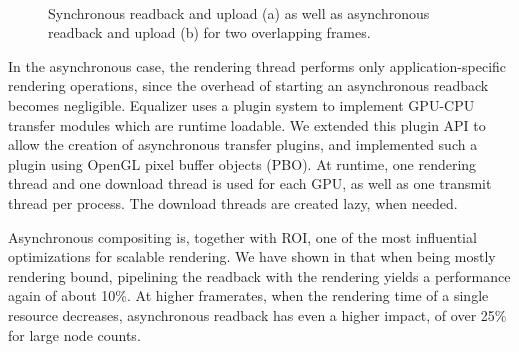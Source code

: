 \begin{figure}[ht]\center
  \\
  \caption{Synchronous readback and upload (a) as well as
    asynchronous readback and upload (b) for two overlapping frames.}
\end{figure}

In the asynchronous case, the rendering thread performs only
application-specific rendering operations, since the overhead of starting an
asynchronous readback becomes negligible. Equalizer uses a plugin system to
implement GPU-CPU transfer modules which are runtime loadable. We extended this
plugin API to allow the creation of asynchronous transfer plugins, and
implemented such a plugin using OpenGL pixel buffer objects (PBO). At runtime,
one rendering thread and one download thread is used for each GPU, as well as
one transmit thread per process. The download threads are created lazy, when
needed.

Asynchronous compositing is, together with ROI, one of the most influential
optimizations for scalable rendering. We have shown in \cite{EBAHMP:12} that
when being mostly rendering bound, pipelining the readback with the rendering
yields a performance again of about 10\%. At higher framerates, when the
rendering time of a single resource decreases, asynchronous readback has even a
higher impact, of over 25\% for large node counts.


